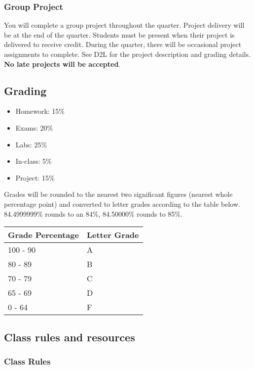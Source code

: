 \documentclass[11pt]{article}
\providecommand{\tightlist}{%
      \setlength{\itemsep}{0pt}\setlength{\parskip}{0pt}}
\begin{document}
    \hypertarget{group-project}{%
\subsubsection{Group Project}\label{group-project}}

You will complete a group project throughout the quarter. Project
delivery will be at the end of the quarter. Students must be present
when their project is delivered to receive credit. During the quarter,
there will be occasional project assignments to complete. See D2L for
the project description and grading details. \textbf{No late projects
will be accepted}.

    \hypertarget{grading}{%
\subsection{Grading}\label{grading}}

\begin{itemize}
\tightlist
\item
  Homework: 15\%
\item
  Exams: 20\%
\item
  Labs: 25\%
\item
  In-class: 5\%
\item
  Project: 15\%
\end{itemize}

Grades will be rounded to the nearest two significant figures (nearest
whole percentage point) and converted to letter grades according to the
table below. 84.4999999\% rounds to an 84\%, 84.50000\% rounds to 85\%.

\begin{longtable}[]{@{}ll@{}}
\toprule
Grade Percentage & Letter Grade\tabularnewline
\midrule
\endhead
100 - 90 & A\tabularnewline
80 - 89 & B\tabularnewline
70 - 79 & C\tabularnewline
65 - 69 & D\tabularnewline
0 - 64 & F\tabularnewline
\bottomrule
\end{longtable}

    \hypertarget{class-rules-and-resources}{%
\subsection{Class rules and resources}\label{class-rules-and-resources}}

\hypertarget{class-rules}{%
\subsubsection{Class Rules}\label{class-rules}}
\end{document}
